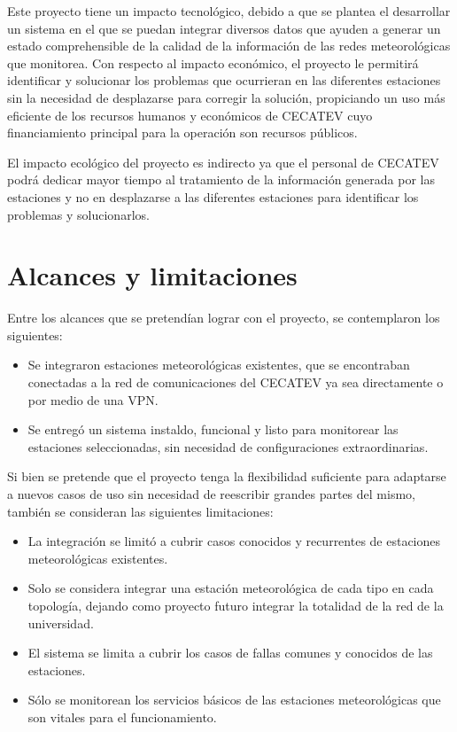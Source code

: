 Este proyecto tiene un impacto tecnológico, debido a que se plantea el desarrollar un sistema en el que se puedan integrar diversos datos que ayuden a generar un estado comprehensible de la calidad de la información de las redes meteorológicas que monitorea. Con respecto al impacto económico, el proyecto le permitirá identificar y solucionar los problemas que ocurrieran en las diferentes estaciones sin la  necesidad de desplazarse para corregir la solución, propiciando un uso más eficiente de los recursos humanos y económicos de CECATEV cuyo financiamiento principal para la operación son recursos públicos.

El impacto ecológico del proyecto es indirecto ya que el personal de CECATEV podrá dedicar mayor tiempo al tratamiento de la información generada por las estaciones y no en desplazarse a las diferentes estaciones para identificar los problemas y solucionarlos.

\section{Alcances y limitaciones}

\noindent Entre los alcances que se pretendían lograr con el proyecto, se contemplaron los siguientes:

\begin{itemize}

   \item Se integraron estaciones meteorológicas existentes, que se encontraban conectadas a la red de comunicaciones del CECATEV ya sea directamente o por medio de una VPN.

   \item Se entregó un sistema instaldo, funcional y listo para monitorear las estaciones seleccionadas, sin necesidad de configuraciones extraordinarias.

\end{itemize}

Si bien se pretende que el proyecto tenga la flexibilidad suficiente para adaptarse a nuevos casos de uso sin necesidad  de reescribir grandes partes del mismo, también se consideran las siguientes limitaciones:

\begin{itemize}

\item La integración se limitó a cubrir casos conocidos y recurrentes de estaciones meteorológicas existentes.
\item Solo se considera integrar una estación meteorológica de cada tipo en cada topología, dejando como proyecto futuro integrar la totalidad de la red de la universidad.
\item El sistema se limita a cubrir los casos de fallas comunes y conocidos de las estaciones.
\item Sólo se monitorean los servicios básicos de las estaciones meteorológicas que son vitales para el funcionamiento.
\end{itemize}
